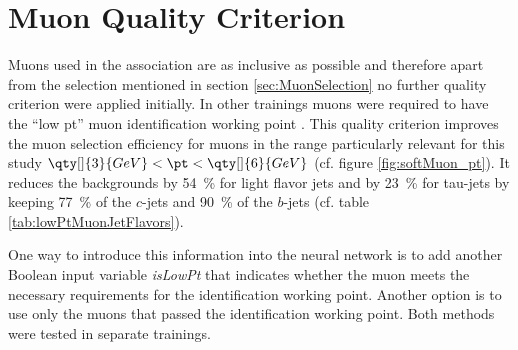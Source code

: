 \section{Muon Quality Criterion}
Muons used in the association are as inclusive as possible and therefore apart from the selection mentioned in section \ref{sec:MuonSelection} no further quality criterion were applied initially. In other trainings muons were required to have the  ``low pt'' muon identification working point \citep{ATL-PHYS-PUB-2020-002}. This quality criterion improves the muon selection efficiency for muons in the range particularly relevant for this study $\qty[]{3}{GeV}<\pt < \qty[]{6}{GeV}$ (cf. figure \ref{fig:softMuon_pt}). It reduces the backgrounds by \qty{54}{\percent} for light flavor jets and by \qty{23}{\percent} for tau-jets by keeping \qty{77}{\percent} of the $c$-jets and \qty{90}{\percent} of the $b$-jets (cf. table \ref{tab:lowPtMuonJetFlavors}).
\begin{table}[]
  \caption{Fraction of associated low pt working point muons per flavor. Fraction of low pt muons to all associated muons (fractions to table \ref{tab:MuonJetFlavors}), the fraction of muons kept after applying the working point. }%
  \label{tab:lowPtMuonJetFlavors}
  \centering
\end{table}
One way to introduce this information into the neural network is to add another Boolean input variable \textit{isLowPt} that indicates whether the muon meets the necessary requirements for the identification working point. Another option is to use only the muons that passed the identification working point. Both methods were tested in separate trainings.

